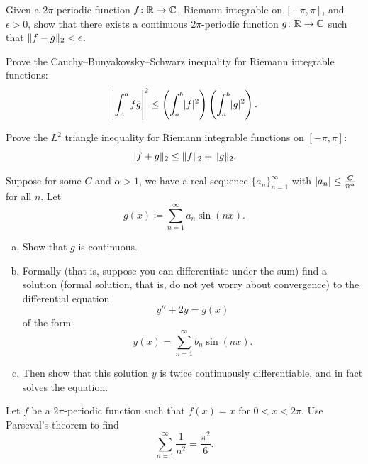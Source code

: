 \begin{exercise}
Given a $2\pi$-periodic function $f \colon {\mathbb{R}} \to {\mathbb{C}}$, Riemann integrable on
$[-\pi,\pi]$,
and $\epsilon > 0$,
show that there exists a continuous $2\pi$-periodic function $g \colon {\mathbb{R}}
\to {\mathbb{C}}$ such that $\lVert {f-g} \rVert_2 < \epsilon$.
\end{exercise}

\begin{exercise}
Prove the Cauchy--Bunyakovsky--Schwarz inequality
for Riemann integrable functions:
\begin{equation*}
{\left\lvert {\int_a^b f\bar{g}} \right\rvert}^2
\leq
\left( \int_a^b \lvert {f} \rvert^2 \right)
\left( \int_a^b \lvert {g} \rvert^2 \right) .
\end{equation*}
\end{exercise}

\begin{exercise}
Prove the $L^2$ triangle inequality 
for Riemann integrable functions on $[-\pi,\pi]$:
\begin{equation*}
\lVert {f+g} \rVert_2 \leq \lVert {f} \rVert_2 + \lVert {g} \rVert_2 .
\end{equation*}
\end{exercise}

\begin{exercise}
\pagebreak[3]
Suppose for some $C$ and $\alpha > 1$, we have
a real sequence $\{ a_n \}_{n=1}^\infty$ with
$\left\lvert {a_n} \right\rvert \leq \frac{C}{n^\alpha}$ for all $n$.
Let
\begin{equation*}
g(x) \coloneqq \sum_{n=1}^\infty a_n \sin(n x) .
\end{equation*}
\begin{enumerate}[a)]
\item
Show that $g$ is continuous.
\item
Formally (that is, suppose you can differentiate under the sum)
find a solution (formal solution, that is, do not yet worry about convergence)
to the differential equation
\begin{equation*}
y''+ 2 y = g(x)
\end{equation*}
of the form
\begin{equation*}
y(x) = \sum_{n=1}^\infty b_n \sin(n x) .
\end{equation*}
\item
Then show that this solution $y$ is twice continuously differentiable,
and in fact solves the equation.
\end{enumerate}
\end{exercise}

\begin{exercise}
Let $f$ be a $2\pi$-periodic  function such
that $f(x) = x$ for $0 < x < 2\pi$.
Use Parseval's theorem to find
\begin{equation*}
\sum_{n=1}^\infty \frac{1}{n^2} = \frac{\pi^2}{6} .
\end{equation*}
\end{exercise}

